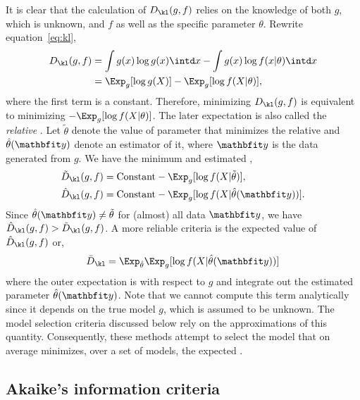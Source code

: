 It is clear that the calculation of $D_{\kl}(g,f)$ relies on the knowledge of
both $g$, which is unknown, and $f$ as well as the specific parameter
$\theta$. Rewrite equation~\eqref{eq:kl},
\begin{align}
  D_{\kl}(g,f)
  &= \int g(x)\log g(x) \intd x - \int g(x) \log f(x|\theta) \intd x \notag\\
  &= \Exp_g[\log g(X)] - \Exp_g[\log f(X|\theta)],
\end{align}
where the first term is a constant. Therefore, minimizing $D_{\kl}(g,f)$ is
equivalent to minimizing $-\Exp_g[\log f(X|\theta)]$. The later expectation is
also called the \emph{relative} \kld. Let $\tilde\theta$ denote the value of
parameter that minimizes the relative \kld and $\hat\theta(\data)$ denote an
estimator of it, where $\data$ is the data generated from $g$. We have the
minimum and estimated \kld,
\begin{align}
  \tilde{D}_{\kl}(g,f) &= \text{Constant} - \Exp_g[\log f(X|\tilde\theta)], \\
  \hat{D}_{\kl}(g,f) &= \text{Constant} - \Exp_g[\log f(X|\hat\theta(\data))].
\end{align}
Since $\hat\theta(\data)\ne\tilde\theta$ for (almost) all data $\data$, we
have $\hat{D}_{\kl}(g,f) > \tilde{D}_{\kl}(g,f)$. A more reliable criteria is
the expected value of $\hat{D}_{\kl}(g,f)$ or,
\begin{equation}
  \bar{D}_{\kl} = \Exp_{\hat\theta}\Exp_g[\log f(X|\hat\theta(\data))]
  \label{eq:expected kl}
\end{equation}
where the outer expectation is with respect to $g$ and integrate out the
estimated parameter $\hat\theta(\data)$. Note that we cannot compute this term
analytically since it depends on the true model $g$, which is assumed to be
unknown. The model selection criteria discussed below rely on the
approximations of this quantity. Consequently, these methods attempt to select
the model that on average minimizes, over a set of models, the expected \kld.

\subsection{Akaike's information criteria}
\label{sub:Akaike's information criteria}

